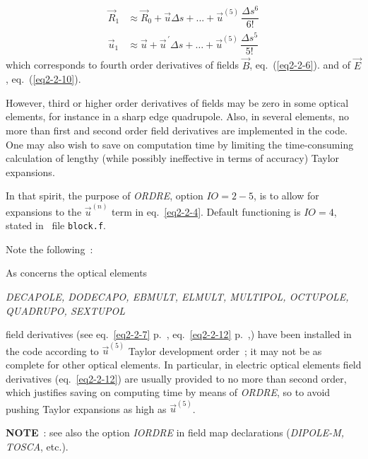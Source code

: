 \begin{align*}
	\vec  R_1 
	     & \approx  \vec  R_0 + \vec  u \Delta s +...+ \vec u^{(5)} \, \dfrac{\Delta s^6 }{ 6!} \\
	\vec  u_1 
	     & \approx  \vec  u + \vec  u^{\,\prime} \Delta s  
	        + \ldots + \vec  u^{(5)}\, \dfrac{\Delta s^5 }{ 5!}   
\end{align*}
%
 which corresponds to fourth order derivatives of fields $ \vec  B $, eq.~(\ref{eq2-2-6}).
 and of $ \vec  E $, eq.~(\ref{eq2-2-10}). 

\smallskip

\noindent However, third or  higher order derivatives of fields  may be zero in some 
optical elements, for instance in a sharp edge quadrupole. Also, in 
several elements, no more than  first and second order field 
derivatives  are implemented in the code.  One may also wish to save on computation time by 
limiting the time-consuming calculation of lengthy (while possibly ineffective in terms 
of accuracy) Taylor expansions. 

\bigskip

\noindent In that spirit, the purpose of \textsl{ORDRE}, option $ IO=2-5$,  is to allow for 
expansions  to the  $ \vec  u^{(n)}$ term  in eq.~\ref{eq2-2-4}. Default functioning 
is $IO=4$, stated in \FORTRAN\ file \texttt{block.f}.

\bigskip

\noindent Note the following~: 

\noindent As concerns the optical elements
\begin{center}
	\textsl{
   DECAPOLE, DODECAPO,  EBMULT, ELMULT, 
	MULTIPOL, OCTUPOLE,   \\
              QUADRUPO, SEXTUPOL}
\end{center}
field derivatives (see eq.~\ref{eq2-2-7} p.~\pageref{eq2-2-7}, eq.~\ref{eq2-2-12} p.~\pageref{eq2-2-12},) 
have been installed in the code according 
to $ \vec  u^{(5)}$ Taylor development order~; it may not 
be as complete for  other optical elements. In particular, 
in electric optical elements field  derivatives (eq.~\ref{eq2-2-12}) are usually provided to no more than second 
order, which justifies saving on computing time by means of \textsl{ORDRE}, 
so to avoid pushing Taylor expansions as high as  $ \vec  u^{(5)}$. 


\bigskip

\noindent\textbf{NOTE}~: see also the option \textsl{IORDRE} in field map
declarations (\textsl{DIPOLE-M, TOSCA}, etc.).  



